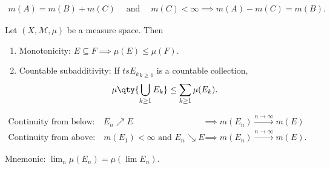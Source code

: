 \begin{proposition}

\begin{align*}m(A) = m(B) + m(C) {\quad \operatorname{and} \quad} m(C) < \infty \implies m(A) - m(C) = m(B).\end{align*}

\end{proposition}

\begin{theorem}

Let \((X, {\mathcal{M}}, \mu)\) be a measure space. Then

\begin{enumerate}
\def\labelenumi{\arabic{enumi}.}
\tightlist
\item
  Monotonicity: \(E \subseteq F \implies \mu(E) \leq \mu(F)\).
\item
  Countable subadditivity: If \(ts{E_k}_{k\geq 1}\) is a countable
  collection,
  \begin{align*}
  \mu\qty{\displaystyle\bigcup_{k\geq 1} E_k} \leq \sum_{k\geq 1} \mu(E_k)
  .\end{align*}
\end{enumerate}

\end{theorem}

\begin{proposition}

\begin{align*}
\text{Continuity from below:} \quad 
E_{n} \nearrow E &\implies m(E_{n}) \overset{n\to\infty}\longrightarrow m(E) \\
\text{Continuity from above:} \quad 
m(E_{1}) < \infty \text{ and } E_{n} \searrow E &\implies m(E_{n}) \overset{n\to\infty}\longrightarrow m(E)
.\end{align*}

Mnemonic: \(\lim_n \mu(E_n) = \mu(\lim E_n)\).

\end{proposition}

